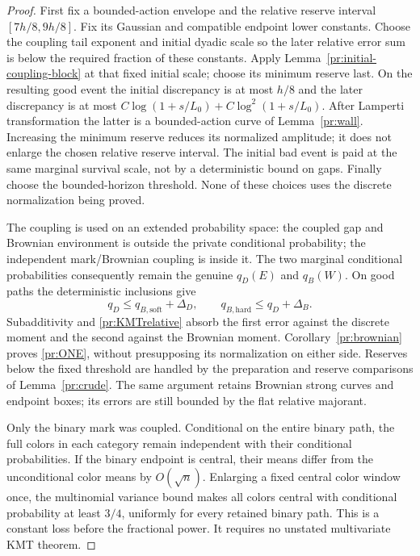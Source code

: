 \begin{proof}
First fix a bounded-action envelope and the relative reserve interval
$[7h/8,9h/8]$. Fix its Gaussian and compatible endpoint lower constants.
Choose the coupling tail exponent and initial dyadic scale so the later
relative error sum is below the required fraction of these constants.
Apply Lemma~\ref{pr:initial-coupling-block} at that fixed initial scale;
choose its minimum reserve last. On the resulting good event the
initial discrepancy is at most $h/8$ and the later discrepancy is at most
$C\log(1+s/L_0)+C\log^2(1+s/L_0)$. After Lamperti transformation the latter
is a bounded-action curve of Lemma~\ref{pr:wall}. Increasing the minimum
reserve reduces its normalized amplitude; it does not enlarge the
chosen relative reserve interval. The initial bad event is paid at the
same marginal survival scale, not by a deterministic bound on gaps.
Finally choose the bounded-horizon threshold. None of these choices
uses the discrete normalization being proved.

The coupling is used on an extended probability space: the coupled gap
and Brownian environment is outside the private conditional probability;
the independent mark/Brownian coupling is inside it. The two marginal
conditional probabilities consequently remain the genuine $q_D(E)$ and
$q_B(W)$. On good paths the deterministic inclusions give
\[
 q_D\le q_{B,\mathrm{soft}}+\Delta_D,
 \qquad q_{B,\mathrm{hard}}\le q_D+\Delta_B.
\]
Subadditivity and \eqref{pr:KMTrelative} absorb the first error against
the discrete moment and the second against the Brownian moment.
Corollary~\ref{pr:brownian} proves \eqref{pr:ONE}, without presupposing
its normalization on either side. Reserves below the fixed threshold
are handled by the preparation and reserve comparisons of
Lemma~\ref{pr:crude}. The same argument retains Brownian strong curves
and endpoint boxes; its errors are still bounded by the flat relative
majorant.

Only the binary mark was coupled. Conditional on the entire binary path,
the full colors in each category remain independent with their conditional
probabilities. If the binary endpoint is central, their means differ
from the unconditional color means by $O(\sqrt n)$. Enlarging a fixed
central color window once, the multinomial variance bound makes all
colors central with conditional probability at least $3/4$, uniformly
for every retained binary path. This is a constant loss before the
fractional power. It requires no unstated multivariate KMT theorem.
\end{proof}

